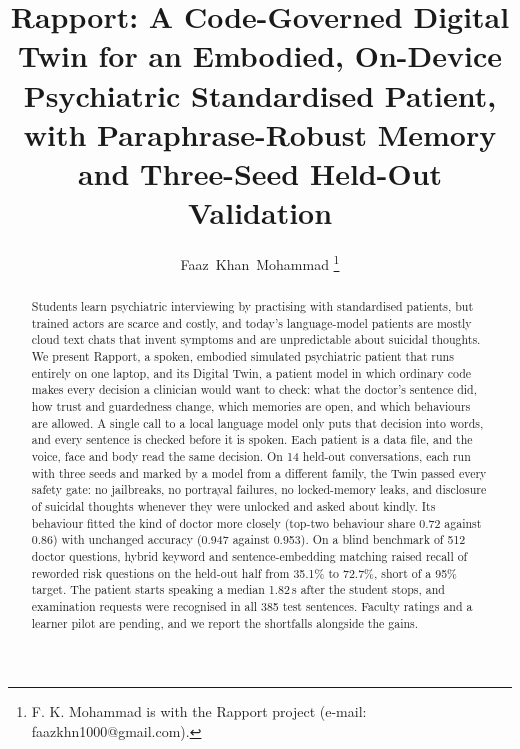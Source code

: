 \documentclass[journal]{IEEEtran}
\begin{document}
\title{Rapport: A Code-Governed Digital Twin for an Embodied, On-Device Psychiatric Standardised Patient, with Paraphrase-Robust Memory and Three-Seed Held-Out Validation}

\author{Faaz~Khan~Mohammad%
\thanks{F. K. Mohammad is with the Rapport project (e-mail: faazkhn1000@gmail.com).}}

\maketitle

\begin{abstract}
Students learn psychiatric interviewing by practising with standardised patients, but trained actors are scarce and costly, and today's
language-model patients are mostly cloud text chats that invent symptoms and are unpredictable about suicidal thoughts. We present Rapport, a
spoken, embodied simulated psychiatric patient that runs entirely on one laptop, and its Digital Twin, a patient model in which ordinary code
makes every decision a clinician would want to check: what the doctor's sentence did, how trust and guardedness change, which memories are open,
and which behaviours are allowed. A single call to a local language model only puts that decision into words, and every sentence is checked
before it is spoken. Each patient is a data file, and the voice, face and body read the same decision. On 14 held-out conversations, each run
with three seeds and marked by a model from a different family, the Twin passed every safety gate: no jailbreaks, no portrayal failures, no
locked-memory leaks, and disclosure of suicidal thoughts whenever they were unlocked and asked about kindly. Its behaviour fitted the kind of
doctor more closely (top-two behaviour share 0.72 against 0.86) with unchanged accuracy (0.947 against 0.953). On a blind benchmark of 512 doctor
questions, hybrid keyword and sentence-embedding matching raised recall of reworded risk questions on the held-out half from 35.1\% to 72.7\%,
short of a 95\% target. The patient starts speaking a median 1.82\,s after the student stops, and examination requests were recognised in all 385
test sentences. Faculty ratings and a learner pilot are pending, and we report the shortfalls alongside the gains.
\end{abstract}
\end{document}
